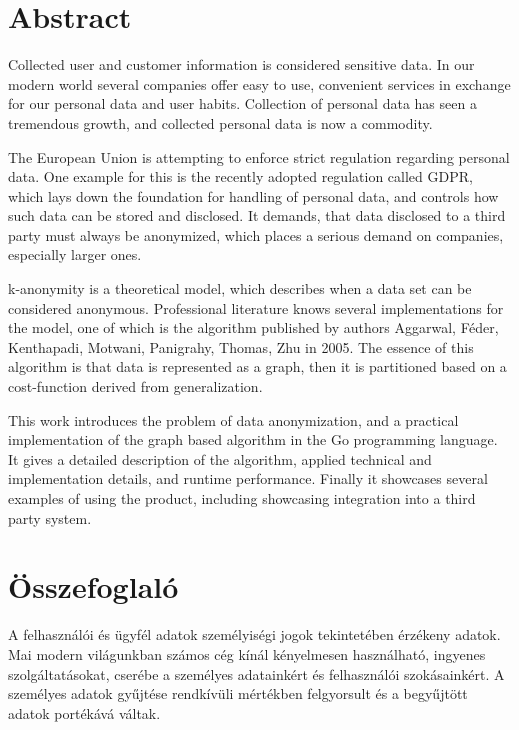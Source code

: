 \section*{Abstract}\label{sec:abstract-en}

Collected user and customer information is considered sensitive data. In our modern world several companies offer easy to use, convenient services in exchange for our personal data and user habits. Collection of personal data has seen a tremendous growth, and collected personal data is now a commodity.

The European Union is attempting to enforce strict regulation regarding personal data. One example for this is the recently adopted regulation called GDPR, which lays down the foundation for handling of personal data, and controls how such data can be stored and disclosed. It demands, that data disclosed to a third party must always be anonymized, which places a serious demand on companies, especially larger ones.

k-anonymity is a theoretical model, which describes when a data set can be considered anonymous. Professional literature knows several implementations for the model, one of which is the algorithm published by authors Aggarwal, Féder, Kenthapadi, Motwani, Panigrahy, Thomas, Zhu in 2005. The essence of this algorithm is that data is represented as a graph, then it is partitioned based on a cost-function derived from generalization.

This work introduces the problem of data anonymization, and a practical implementation of the graph based algorithm in the Go programming language. It gives a detailed description of the algorithm, applied technical and implementation details, and runtime performance. Finally it showcases several examples of using the product, including showcasing integration into a third party system.

\clearpage
\thispagestyle{empty}
\pagebreak

\section*{Összefoglaló}\label{sec:abstract-hu}

A felhasználói és ügyfél adatok személyiségi jogok tekintetében érzékeny adatok. Mai modern világunkban számos cég kínál kényelmesen használható, ingyenes szolgáltatásokat, cserébe a személyes adatainkért és felhasználói szokásainkért. A személyes adatok gyűjtése rendkívüli mértékben felgyorsult és a begyűjtött adatok portékává váltak.

